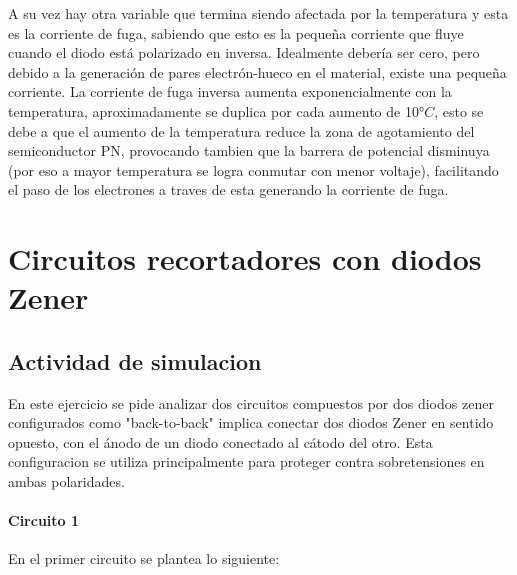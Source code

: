 \documentclass[chaptersright]{informeutn}
\begin{document}
        A su vez hay otra variable que termina siendo afectada por la temperatura y esta es la corriente de fuga,
        sabiendo que esto es la pequeña corriente que fluye cuando el diodo está polarizado en inversa. Idealmente
        debería ser cero, pero debido a la generación de pares electrón-hueco en el material, existe una pequeña
        corriente. La corriente de fuga inversa aumenta exponencialmente con la temperatura, aproximadamente se
        duplica por cada aumento de 10$°C$, esto se debe a que el aumento de la temperatura reduce la zona de
        agotamiento del semiconductor PN, provocando tambien que la barrera de potencial disminuya (por eso a mayor
        temperatura se logra conmutar con menor voltaje), facilitando el paso de los electrones a traves de esta
        generando la corriente de fuga.





  \part{Circuitos recortadores con diodos Zener}
    \chapter{Actividad de simulacion}
        En este ejercicio se pide analizar dos circuitos compuestos por dos diodos zener configurados como
        "back-to-back" implica conectar dos diodos Zener en sentido opuesto, con el ánodo de un diodo conectado al
        cátodo del otro. Esta configuracion se utiliza principalmente para proteger contra sobretensiones en ambas
        polaridades.

        \subsection{Circuito 1}

            En el primer circuito  se plantea lo siguiente:
\end{document}
